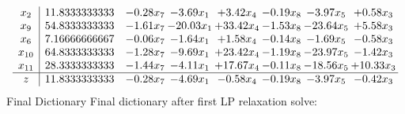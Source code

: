 \documentclass[8pt]{article}
\begin{document}
 \[\begin{array}{c| c c@{\hskip 2pt} c@{\hskip 2pt} c@{\hskip 2pt} c@{\hskip 2pt} c@{\hskip 2pt} c@{\hskip 2pt} }
 x_{2}   &  11.8333333333 & -0.28 x_{7} & -3.69 x_{1} & +  3.42 x_{4} & -0.19 x_{8} & -3.97 x_{5} & +  0.58 x_{3}\\
 x_{9}   &  54.8333333333 & -1.61 x_{7} & -20.03 x_{1} & + 33.42 x_{4} & -1.53 x_{8} & -23.64 x_{5} & +  5.58 x_{3}\\
 x_{6}   &  7.16666666667 & -0.06 x_{7} & -1.64 x_{1} & +  1.58 x_{4} & -0.14 x_{8} & -1.69 x_{5} & -0.58 x_{3}\\
 x_{10}   &  64.8333333333 & -1.28 x_{7} & -9.69 x_{1} & + 23.42 x_{4} & -1.19 x_{8} & -23.97 x_{5} & -1.42 x_{3}\\
 x_{11}   &  28.3333333333 & -1.44 x_{7} & -4.11 x_{1} & + 17.67 x_{4} & -0.11 x_{8} & -18.56 x_{5} & + 10.33 x_{3}\\
\hline
z    &  11.8333333333 & -0.28 x_{7} & -4.69 x_{1} & -0.58 x_{4} & -0.19 x_{8} & -3.97 x_{5} & -0.42 x_{3}\\
\end{array}\]
Final Dictionary
Final dictionary after first LP relaxation solve: 
\end{document}
